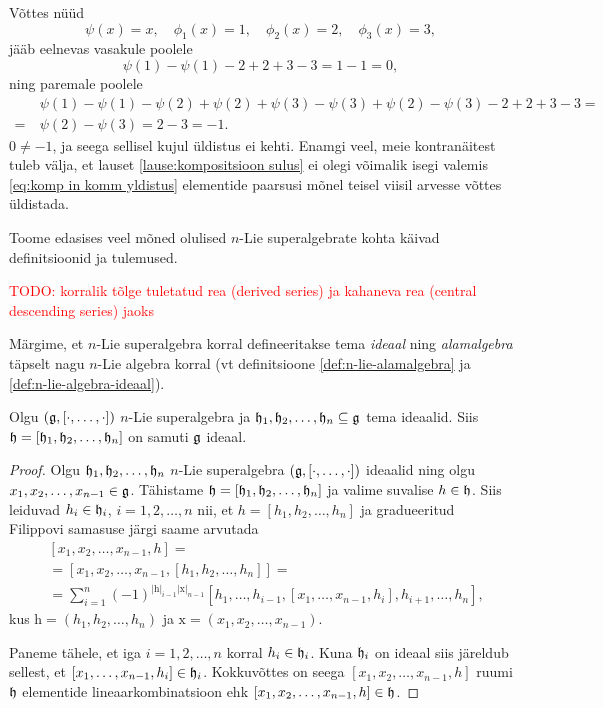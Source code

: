 \begin{markus}
    Võttes nüüd
    \[
        \psi(x) = x, \quad
        \phi_1 (x) = 1, \quad
        \phi_2 (x) = 2, \quad
        \phi_3 (x) = 3,
    \]
    jääb eelnevas vasakule poolele
    \[ \psi(1) - \psi(1) - 2 + 2 + 3 - 3 = 1 - 1 = 0, \]
    ning paremale poolele
    \begin{align*}
        &\psi(1) - \psi(1) - \psi(2) + \psi(2) + \psi(3) - \psi(3) +
            \psi(2) - \psi(3) - 2 + 2 + 3 - 3 = \\
        =\ &\psi(2) - \psi(3) = 2 - 3 = -1.
    \end{align*}
    $0 \neq -1$, ja seega sellisel kujul üldistus ei kehti.
    Enamgi veel, meie kontranäitest tuleb välja, et lauset
    \ref{lause:kompositsioon sulus} ei olegi
    võimalik isegi valemis \eqref{eq:komp in komm yldistus}
    elementide paarsusi mõnel teisel viisil arvesse võttes
    üldistada.
\end{markus}


Toome edasises veel mõned olulised $n$-Lie superalgebrate kohta
käivad definitsioonid ja tulemused.

\textcolor{red}{
    TODO: korralik tõlge tuletatud rea (derived series) ja
    kahaneva rea (central descending series) jaoks
}


Märgime, et $n$-Lie superalgebra korral defineeritakse tema
\emph{ideaal} ning \emph{alamalgebra} täpselt nagu $n$-Lie algebra
korral (vt definitsioone \ref{def:n-lie-alamalgebra} ja
\ref{def:n-lie-algebra-ideaal}).

\begin{lemma}
    Olgu $(\mathfrak{g}, [\cdot, \dots, \cdot])$ $n$-Lie superalgebra ja
    $\mathfrak{h}_1, \mathfrak{h}_2, \dots, \mathfrak{h}_n \subseteq \mathfrak{g}$ tema ideaalid. Siis
    $\mathfrak{h} = [\mathfrak{h}_1, \mathfrak{h}_2, \dots, \mathfrak{h}_n]$ on samuti $\mathfrak{g}$ ideaal.
\end{lemma}

\begin{proof}
    Olgu $\mathfrak{h}_1, \mathfrak{h}_2, \dots, \mathfrak{h}_n$ $n$-Lie superalgebra
    $(\mathfrak{g}, [\cdot, \dots, \cdot])$ ideaalid ning olgu
    $x_1, x_2, \dots, x_{n-1} \in \mathfrak{g}$. Tähistame
    $\mathfrak{h} = [\mathfrak{h}_1, \mathfrak{h}_2, \dots, \mathfrak{h}_n]$ ja valime suvalise $h \in \mathfrak{h}$.
    Siis leiduvad $h_i \in \mathfrak{h}_i$, $i = 1, 2, \dots, n$ nii, et
    $h = [h_1, h_2, \dots, h_n]$ ja gradueeritud Filippovi samasuse
    järgi saame arvutada
    \begin{align*}
        &[x_1, x_2, \dots, x_{n-1}, h] = \\
        &=[x_1, x_2, \dots, x_{n-1}, [h_1, h_2, \dots, h_n]] = \\
        &=\sum_{i = 1}^{n} (-1)^{|\mathrm{h}|_{i-1} |\mathrm{x}|_{n-1}}
            [h_1, \dots, h_{i-1}, [x_1, \dots, x_{n-1}, h_i],
            h_{i+1}, \dots, h_n],
    \end{align*}
    kus $\mathrm{h} = (h_1, h_2, \dots, h_n)$ ja
    $\mathrm{x} = (x_1, x_2, \dots, x_{n-1})$.

    Paneme tähele, et iga $i = 1, 2, \dots, n$ korral $h_i \in \mathfrak{h}_i$.
    Kuna $\mathfrak{h}_i$ on ideaal siis järeldub sellest, et
    $[x_1, \dots, x_{n-1}, h_i] \in \mathfrak{h}_i$. Kokkuvõttes on seega
    $[x_1, x_2, \dots, x_{n-1}, h]$ ruumi $\mathfrak{h}$ elementide lineaarkombinatsioon
    ehk $[x_1, x_2, \dots, x_{n-1}, h] \in \mathfrak{h}$.
\end{proof}


